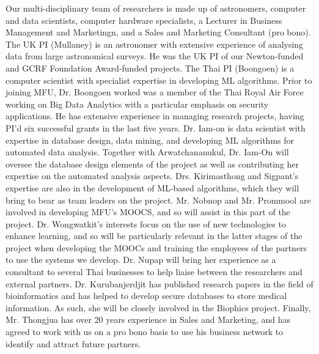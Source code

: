 \documentclass[11pt]{article}
\begin{document}
  \noindent
  Our multi-disciplinary team of researchers is made up of astronomers, computer and data scientists, computer hardware specialists, a Lecturer in Business Management and Marketingn, and a Sales and Marketing Consultant (pro bono). The UK PI (Mullaney) is an astronomer with extensive experience of analysing data from large astronomical surveys. He was the UK PI of our Newton-funded and GCRF Foundation Award-funded projects. The Thai PI (Boongoen) is a computer scientist with specialist expertise in developing ML algorithms. Prior to joining MFU, Dr. Boongoen worked was a member of the Thai Royal Air Force working on Big Data Analytics with a particular emphasis on security applications. He has extensive experience in managing research projects, having PI'd six successful grants in the last five years. Dr. Iam-on is data scientist with expertise in database design, data mining, and developing ML algorithms for automated data analysis. Together with Arwatchananukul, Dr. Iam-On will oversee the database design elements of the project as well as contributing her expertise on the automated analysis aspects. Drs. Kirimasthong and Sigpant's expertise are also in the development of ML-based algorithms, which they will bring to bear as team leaders on the project. Mr. Nobnop and Mr. Prommool are involved in developing MFU's MOOCS, and so will assist in this part of the project. Dr. Wongwatkit's interests focus on the use of new technologies to enhance learning, and so will be particularly relevant in the latter stages of the project when developing the MOOCs and training the employees of the partners to use the systems we develop. Dr. Nupap will bring her experience as a consultant to several Thai businesses to help liaise between the researchers and external partners. Dr. Kurubanjerdjit has published research papers in the field of bioinformatics and has helped to develop secure databases to store medical information. As such, she will be closely involved in the Biophics project. Finally, Mr. Thongjua has over 20 years experience in Sales and Marketing, and has agreed to work with us on a pro bono basis to use his business network to identify and attract future partners.
  
  
\end{document}

